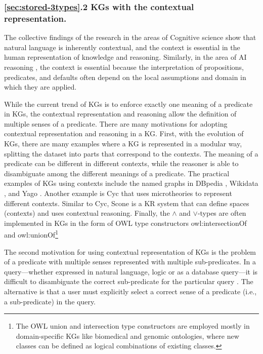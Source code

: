 \documentclass[runningheads]{llncs}
\begin{document}
% 



\subsubsection{\ref{sec:stored-3types}.2 KGs with the contextual representation.}

The collective findings of the research in the areas of Cognitive
science \cite{Stenning2008,Hollister2017} show that natural language
is inherently contextual, and the context is essential in the human
representation of knowledge and reasoning. Similarly, in the area of
AI reasoning \cite{McCarthy1993,Ghidini2001,Brewka2007}, the context
is essential because the interpretation of propositions, predicates,
and defaults often depend on the local assumptions and domain in which
they are applied.

While the current trend of KGs is to enforce exactly one meaning of a
predicate in KGs, the contextual representation and reasoning allow
the definition of multiple senses of a predicate. There are many
motivations for adopting contextual representation and reasoning in a
KG. First, with the evolution of KGs, there are many examples where a
KG is represented in a modular way, splitting the dataset into parts
that correspond to the contexts. The meaning of a predicate can be
different in different contexts, while the reasoner is able to
disambiguate among the different meanings of a predicate.  The
practical examples of KGs using contexts include the named graphs in
DBpedia \cite{Auer2007}, Wikidata \cite{vrandecic2014}, and Yago
\cite{Hoffart2013}. Another example is Cyc \cite{cyc} that uses
microtheories to represent different contexts. Similar to Cyc, Scone
\cite{Fahlman2011} is a KR system that can define spaces (contexts)
and uses contextual reasoning. Finally, the $\land$ and $\lor$-types
are often implemented in KGs in the form of OWL type constructors
owl:intersectionOf and owl:unionOf\footnote{The OWL union and
  intersection type constructors are employed mostly in
  domain-specific KGs like biomedical and genomic ontologies, where new
  classes can be defined as logical combinations of existing classes.}

The second motivation for using contextual representation of KGs is
the problem of a predicate with multiple senses represented with
multiple sub-predicates. In a query---whether expressed in natural
language, logic or as a database query---it is difficult to
disambiguate the correct sub-predicate for the particular query
\cite{cyc}. The alternative is that a user must explicitly select a
correct sense of a predicate (i.e., a sub-predicate) in the query.
\end{document}
